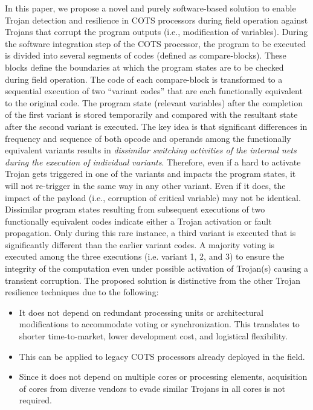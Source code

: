 \documentclass[conference]{IEEEtran}
\begin{document}
In this paper, we propose a novel and purely software-based solution to enable Trojan detection and resilience in COTS processors during field operation against Trojans that corrupt the program outputs (i.e., modification of variables). 
During the software integration step of the COTS processor, the program to be executed is divided into several segments of codes (defined as compare-blocks). These blocks define the boundaries at which the program states are to be checked during field operation. The code of each compare-block is transformed to a sequential execution of two ``variant codes'' that are each functionally equivalent to the original code. The program state (relevant variables) after the completion of the first variant is stored temporarily and compared with the resultant state after the second variant is executed. The key idea is that significant differences in frequency and sequence of both opcode and operands among the functionally equivalent variants results in \textit{dissimilar switching activities of the internal nets during the execution of individual variants}. Therefore, even if a hard to activate Trojan gets triggered in one of the variants and impacts the program states, it will not re-trigger in the same way in any other variant. Even if it does, the impact of the payload (i.e., corruption of critical variable) may not be identical. Dissimilar program states resulting from subsequent executions of two functionally equivalent codes indicate either a Trojan activation or fault propagation. Only during this rare instance, a third variant is executed that is significantly different than the earlier variant codes. A majority voting is executed among the three executions (i.e. variant 1, 2, and 3) to ensure the integrity of the computation even under possible activation of Trojan(s) causing a transient corruption. 
The proposed solution is distinctive from the other Trojan resilience techniques \cite{ref:safer} due to the following:
\begin{itemize}


 \item It does not depend on redundant processing units or architectural modifications to accommodate voting or synchronization. This translates to shorter time-to-market, lower development cost, and logistical flexibility.      

\item This can be applied to legacy COTS processors already deployed in the field. 

\item Since it does not depend on multiple cores or processing elements, acquisition of cores from diverse vendors to evade similar Trojans in all cores is not required. 
\end{itemize}
\end{document}
